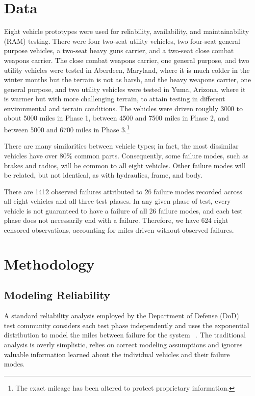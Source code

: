 \documentclass[12pt]{article}
\begin{document}
\section{Data}
Eight vehicle prototypes were used for reliability, availability,
and maintainability (RAM) testing. There were four two-seat utility vehicles,
two four-seat general purpose vehicles, a two-seat heavy guns carrier, and a
two-seat close combat weapons carrier. The close combat weapons carrier, one
general purpose, and two utility vehicles were tested in Aberdeen, Maryland,
where it is much colder in the winter months but the terrain is not as harsh,
and the heavy weapons carrier, one general purpose, and two utility vehicles
were tested in Yuma, Arizona, where it is warmer but with more challenging
terrain, to attain testing in different environmental and terrain conditions.
The vehicles were driven roughly 3000 to about 5000 miles in Phase 1, between
4500 and 7500 miles in Phase 2, and between 5000 and 6700 miles in Phase
3.\footnote{The exact mileage has been altered to protect proprietary
information.}

There are many similarities between vehicle types; in fact, the most dissimilar
vehicles have over 80\% common parts. Consequently, some failure modes, such as
brakes and radios, will be common to all eight vehicles. Other failure modes
will be related, but not identical, as with hydraulics, frame, and body.

There are 1412 observed failures attributed to 26 failure modes recorded across
all eight vehicles and all three test phases. In any given phase of test, every
vehicle is not guaranteed to have a failure of all 26 failure modes, and each
test phase does not necessarily end with a failure. Therefore, we have 624 right
censored observations, accounting for miles driven without observed failures.

\section{Methodology}

\subsection{Modeling Reliability}
A standard reliability analysis employed by the Department of Defense (DoD) test
community considers each test phase independently and uses the exponential
distribution to model the miles between failure for the system ~\cite{ref1}. The
traditional analysis is overly simplistic, relies on correct modeling
assumptions and ignores valuable information learned about the individual
vehicles and their failure modes.
\end{document}
